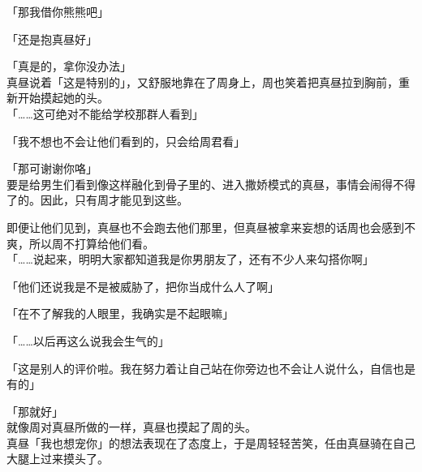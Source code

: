 「那我借你熊熊吧」

「还是抱真昼好」

「真是的，拿你没办法」\\

真昼说着「这是特别的」，又舒服地靠在了周身上，周也笑着把真昼拉到胸前，重新开始摸起她的头。\\

「……这可绝对不能给学校那群人看到」

「我不想也不会让他们看到的，只会给周君看」

「那可谢谢你咯」\\

要是给男生们看到像这样融化到骨子里的、进入撒娇模式的真昼，事情会闹得不得了的。因此，只有周才能见到这些。

即便让他们见到，真昼也不会跑去他们那里，但真昼被拿来妄想的话周也会感到不爽，所以周不打算给他们看。\\

「……说起来，明明大家都知道我是你男朋友了，还有不少人来勾搭你啊」

「他们还说我是不是被威胁了，把你当成什么人了啊」

「在不了解我的人眼里，我确实是不起眼嘛」

「……以后再这么说我会生气的」

「这是别人的评价啦。我在努力着让自己站在你旁边也不会让人说什么，自信也是有的」

「那就好」\\

就像周对真昼所做的一样，真昼也摸起了周的头。\\

真昼「我也想宠你」的想法表现在了态度上，于是周轻轻苦笑，任由真昼骑在自己大腿上过来摸头了。
